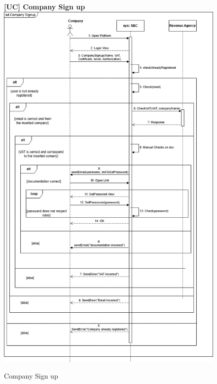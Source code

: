 \begin{figure}[H]
\textbf{[UC\nextUCDiagr] Company Sign up}\newline\newline
\includegraphics[width=15cm]{Images/UC_diagram/RASD-UC3.drawio (1).png}
    \caption{Company Sign up}
\end{figure}

